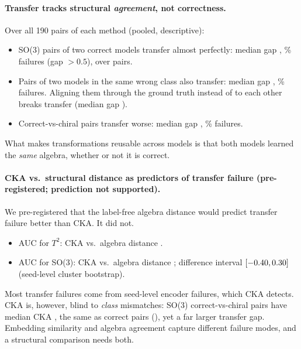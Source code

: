 \paragraph{Transfer tracks structural \emph{agreement}, not correctness.}
Over all 190 pairs of each method (pooled, descriptive):
\begin{itemize}
\item SO(3) pairs of two correct models transfer almost perfectly: median gap \REfiveSOthreeBothcorrectGap{},
\REfiveSOthreeBothcorrectFail\% failures (gap $>0.5$), over \REfiveSOthreeBothcorrectN{} pairs.
\item Pairs of two models in the same wrong class also transfer: median gap \REfiveSOthreeBothsameincorrectGap{},
\REfiveSOthreeBothsameincorrectFail\% failures. Aligning them through the ground truth instead of to each other
breaks transfer (median gap \REfiveSOthreeBothsameincorrectOraclegap).
\item Correct-vs-chiral pairs transfer worse: median gap \REfiveSOthreeCorrectvsincorrectGap{},
\REfiveSOthreeCorrectvsincorrectFail\% failures.
\end{itemize}
What makes transformations reusable across models is that both models learned the \emph{same} algebra, whether or not
it is correct.

\paragraph{CKA vs.\ structural distance as predictors of transfer failure (pre-registered; prediction not supported).}
We pre-registered that the label-free algebra distance would predict transfer failure better than CKA. It did not.
\begin{itemize}
\item AUC for $T^2$: CKA \REfiveTtwoAuccka{} vs.\ algebra distance \REfiveTtwoAucdist.
\item AUC for SO(3): CKA \REfiveSOthreeAuccka{} vs.\ algebra distance \REfiveSOthreeAucdist; difference interval
$[-0.40,0.30]$ (seed-level cluster bootstrap).
\end{itemize}
Most transfer failures come from seed-level encoder failures, which CKA detects. CKA is, however, blind to
\emph{class} mismatches: SO(3) correct-vs-chiral pairs have median CKA \REfiveSOthreeCorrectvsincorrectCka{}, the same as
correct pairs (\REfiveSOthreeBothcorrectCka), yet a far larger transfer gap. Embedding similarity and algebra
agreement capture different failure modes, and a structural comparison needs both.
